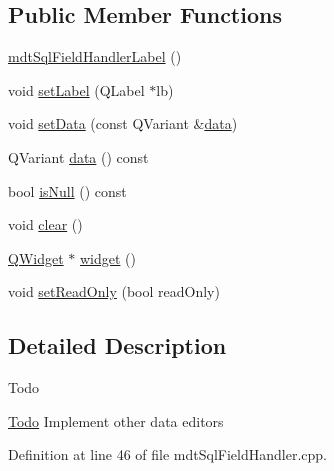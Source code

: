 \subsection*{Public Member Functions}
\begin{DoxyCompactItemize}
\item 
\hyperlink{classmdt_sql_field_handler_label_a2932d5fc753811990db80ee00dcf449e}{mdt\-Sql\-Field\-Handler\-Label} ()
\item 
void \hyperlink{classmdt_sql_field_handler_label_aa7a299bf3a0ceabc07fccbe315c0324f}{set\-Label} (Q\-Label $\ast$lb)
\item 
void \hyperlink{classmdt_sql_field_handler_label_aec2da7423e83744cb0e7e9bbd64a2c8c}{set\-Data} (const Q\-Variant \&\hyperlink{classmdt_sql_field_handler_label_a844761927071cfe1567028f950abc028}{data})
\item 
Q\-Variant \hyperlink{classmdt_sql_field_handler_label_a844761927071cfe1567028f950abc028}{data} () const 
\item 
bool \hyperlink{classmdt_sql_field_handler_label_a84ab11e4fb30612f7bf1fb04939f007c}{is\-Null} () const 
\item 
void \hyperlink{classmdt_sql_field_handler_label_a403109863b7ad3828a7e38bfc8414e34}{clear} ()
\item 
\hyperlink{class_q_widget}{Q\-Widget} $\ast$ \hyperlink{classmdt_sql_field_handler_label_a53007a4daf4e52a4f4ecd2e59318e0e7}{widget} ()
\item 
void \hyperlink{classmdt_sql_field_handler_label_a20bb295db1a447183fcf9831c3210593}{set\-Read\-Only} (bool read\-Only)
\end{DoxyCompactItemize}


\subsection{Detailed Description}
\begin{DoxyRefDesc}{Todo}
\item[\hyperlink{todo__todo000006}{Todo}]Implement other data editors \end{DoxyRefDesc}


Definition at line 46 of file mdt\-Sql\-Field\-Handler.\-cpp.




